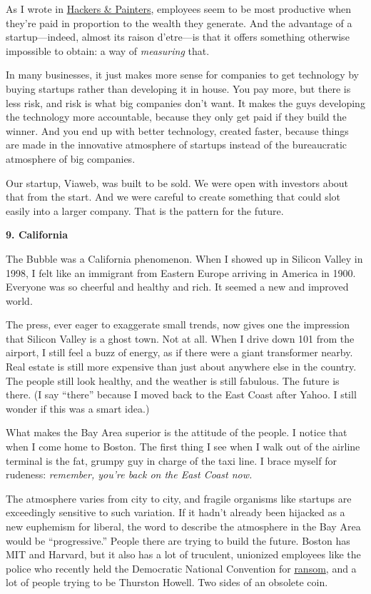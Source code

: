 \documentclass[12pt]{book}
\begin{document}
As I wrote in \href{hackpaint.html}{Hackers \& Painters}, employees seem
to be most productive when they're paid in proportion to the wealth they
generate. And the advantage of a startup---indeed, almost its raison
d'etre---is that it offers something otherwise impossible to obtain: a
way of \emph{measuring} that.

In many businesses, it just makes more sense for companies to get
technology by buying startups rather than developing it in house. You
pay more, but there is less risk, and risk is what big companies don't
want. It makes the guys developing the technology more accountable,
because they only get paid if they build the winner. And you end up with
better technology, created faster, because things are made in the
innovative atmosphere of startups instead of the bureaucratic atmosphere
of big companies.

Our startup, Viaweb, was built to be sold. We were open with investors
about that from the start. And we were careful to create something that
could slot easily into a larger company. That is the pattern for the
future.

\textbf{9. California}

The Bubble was a California phenomenon. When I showed up in Silicon
Valley in 1998, I felt like an immigrant from Eastern Europe arriving in
America in 1900. Everyone was so cheerful and healthy and rich. It
seemed a new and improved world.

The press, ever eager to exaggerate small trends, now gives one the
impression that Silicon Valley is a ghost town. Not at all. When I drive
down 101 from the airport, I still feel a buzz of energy, as if there
were a giant transformer nearby. Real estate is still more expensive
than just about anywhere else in the country. The people still look
healthy, and the weather is still fabulous. The future is there. (I say
``there'' because I moved back to the East Coast after Yahoo. I still
wonder if this was a smart idea.)

What makes the Bay Area superior is the attitude of the people. I notice
that when I come home to Boston. The first thing I see when I walk out
of the airline terminal is the fat, grumpy guy in charge of the taxi
line. I brace myself for rudeness: \emph{remember, you're back on the
East Coast now.}

The atmosphere varies from city to city, and fragile organisms like
startups are exceedingly sensitive to such variation. If it hadn't
already been hijacked as a new euphemism for liberal, the word to
describe the atmosphere in the Bay Area would be ``progressive.'' People
there are trying to build the future. Boston has MIT and Harvard, but it
also has a lot of truculent, unionized employees like the police who
recently held the Democratic National Convention for
\href{http://www.usatoday.com/news/politicselections/nation/president/2004-04-30-boston-police-convention_x.htm}{ransom},
and a lot of people trying to be Thurston Howell. Two sides of an
obsolete coin.
\end{document}
